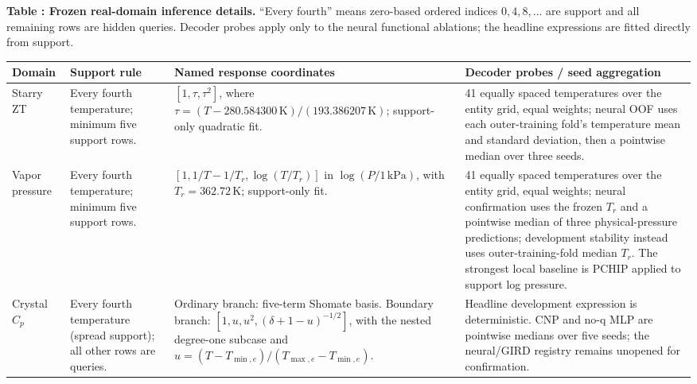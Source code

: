\begin{center}
\begin{minipage}{\textwidth}
  \centering
  \label{tab:domain-protocol}
  \small
  \textbf{Table \thetable: Frozen real-domain inference details.}
  ``Every fourth'' means zero-based ordered indices $0,4,8,\ldots$ are support
  and all remaining rows are hidden queries.  Decoder probes apply only to the
  neural functional ablations; the headline expressions are fitted directly
  from support.

  \setlength{\tabcolsep}{3.2pt}
  \begin{tabular}{@{}p{}p{}p{}p{}@{}}
    \toprule
    Domain & Support rule & Named response coordinates & Decoder probes / seed aggregation \\
    \midrule
    Starry ZT & Every fourth temperature; minimum five support rows.
      & $[1,\tau,\tau^2]$, where
        $\tau=(T-280.584300\,\mathrm{K})/(193.386207\,\mathrm{K})$; support-only
        quadratic fit.
      & 41 equally spaced temperatures over the entity grid, equal weights;
        neural OOF uses each outer-training fold's temperature mean and
        standard deviation, then a pointwise median over three seeds. \\
    Vapor pressure & Every fourth temperature; minimum five support rows.
      & $[1,1/T-1/T_r,\log(T/T_r)]$ in $\log(P/1\,\mathrm{kPa})$, with
        $T_r=362.72\,\mathrm{K}$; support-only fit.
      & 41 equally spaced temperatures over the entity grid, equal weights;
        neural confirmation uses the frozen $T_r$ and a pointwise median of
        three physical-pressure predictions; development stability instead
        uses outer-training-fold median $T_r$.  The strongest local baseline is
        PCHIP applied to support log pressure. \\
    Crystal $C_p$ & Every fourth temperature (spread support); all other rows
      are queries.
      & Ordinary branch: five-term Shomate basis.  Boundary branch:
        $[1,u,u^2,(\delta+1-u)^{-1/2}]$, with the nested degree-one subcase and
        $u=(T-T_{\min,e})/(T_{\max,e}-T_{\min,e})$.
      & Headline development expression is deterministic.  CNP and no-q MLP
        are pointwise medians over five seeds; the neural/GIRD registry remains
        unopened for confirmation. \\
    \bottomrule
  \end{tabular}
\end{minipage}
\end{center}

